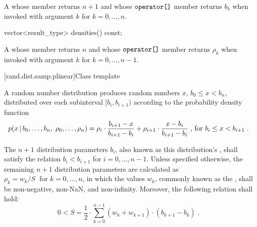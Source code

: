 \begin{itemdescr}
\pnum\returns A 
 whose  member returns $n + 1$
 and whose $ \texttt{operator[]} $ member returns $b_k$
 when invoked with argument $k$ for $k = 0, \ldots, n $.
\end{itemdescr}

%
%
\begin{itemdecl}
vector<result_type> densities() const;
\end{itemdecl}

\begin{itemdescr}
\pnum\returns A 
 whose  member returns $n$
 and whose $ \texttt{operator[]} $ member returns $\rho_k$
 when invoked with argument $k$ for $k = 0, \ldots, n\!-\!1 $.
\end{itemdescr}



[rand.dist.samp.plinear]{Class template }%
%

\pnum
A  random number distribution
produces random numbers $x$,
$ b_0 \leq x < b_n $,
distributed over each subinterval
$ [ b_i, b_{i+1} ) $
according to the probability density function
%
\[%
 p(x\,|\,b_0,\ldots,b_n,\;\rho_0,\ldots,\rho_n)
      = \rho_i     \cdot {{b_{i+1} - x} \over {b_{i+1} - b_i}}
      + \rho_{i+1} \cdot {{x - b_i} \over {b_{i+1} - b_i}}
\; \mbox{,}
\mbox{ for } b_i \le x < b_{i+1}
\; \mbox{.}
\]

\pnum
The $n+1$ distribution parameters $b_i$,
also known as this distribution's %
%
%
, shall satisfy the relation
 $ b_i < b_{i+1} $
for $i = 0, \ldots, n\!-\!1 $.
Unless specified otherwise,
the remaining $n+1$ distribution parameters are calculated as
$ \rho_k = {w_k / S} \; \mbox{ for } k = 0, \ldots, n $,
in which the values $w_k$,
commonly known as the %
%
%
, shall be non-negative, non-NaN, and non-infinity.
Moreover, the following relation shall hold:
\[%
 0 < S = \frac{1}{2}
       \cdot \sum_{k=0}^{n-1} (w_k + w_{k+1}) \cdot (b_{k+1} - b_k)
\; \mbox{.}
\]


